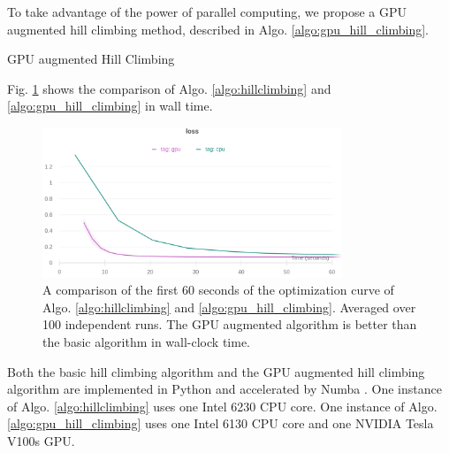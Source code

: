 To take advantage of the power of parallel computing, we propose a GPU augmented hill climbing method, described in Algo. \ref{algo:gpu_hill_climbing}.

\begin{algorithm}
    \caption{GPU augmented Hill Climbing}\label{algo:gpu_hill_climbing}
\end{algorithm}

Fig. \ref{fig:gpu_hill_climbing} shows the comparison of Algo. \ref{algo:hillclimbing} and \ref{algo:gpu_hill_climbing} in wall time.

\begin{figure}
    \centering
    \includegraphics[width=0.8\textwidth]{images/curve_60s.png}
    \caption{A comparison of the first 60 seconds of the optimization curve of Algo. \ref{algo:hillclimbing} and \ref{algo:gpu_hill_climbing}. 
    Averaged over 100 independent runs.
    The GPU augmented algorithm is better than the basic algorithm in wall-clock time.
    }
    \label{fig:gpu_hill_climbing}
\end{figure}

Both the basic hill climbing algorithm and the GPU augmented hill climbing algorithm are implemented in Python and accelerated by Numba \cite{lam_numba_2015}.
One instance of Algo. \ref{algo:hillclimbing} uses one Intel 6230 CPU core.
One instance of Algo. \ref{algo:gpu_hill_climbing} uses one Intel 6130 CPU core and one NVIDIA Tesla V100s GPU.

